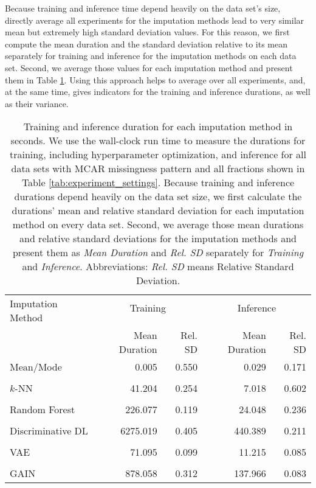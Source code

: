 Because training and inference time depend heavily on the data set's size, directly average all experiments for the imputation methods lead to very similar mean but extremely high standard deviation values. For this reason, we first compute the mean duration and the standard deviation relative to its mean separately for training and inference for the imputation methods on each data set. Second, we average those values for each imputation method and present them in Table \ref{tab:time}. Using this approach helps to average over all experiments, and, at the same time, gives indicators for the training and inference durations, as well as their variance.
%
\begin{table}
	\centering
	\begin{tabular}{@{\extracolsep{4pt}}lrrrr@{}}
		\toprule
		\multirow{2}{*}{Imputation Method} & \multicolumn{2}{c}{Training} & \multicolumn{2}{c}{Inference} \\\cline{2-3}\cline{4-5}
		\\[-0.75em]
		& Mean Duration &   Rel. SD & Mean Duration &   Rel. SD \\
		\midrule
		Mean/Mode &      0.005 &  0.550 &      0.029 &  0.171 \\
		\\[-0.5em]
		$k$-NN &     41.204 &  0.254 &       7.018 &  0.602 \\
		\\[-0.5em]
		Random Forest &    226.077 &  0.119 &     24.048 &  0.236 \\
		\\[-0.5em]
		Discriminative DL &   6275.019 &   0.405 &    440.389 &  0.211 \\
		\\[-0.5em]
		VAE &     71.095 &  0.099 &      11.215 &  0.085 \\
		\\[-0.5em]
		GAIN &    878.058 &  0.312 &     137.966 &  0.083 \\
		\bottomrule
	\end{tabular}
	\caption{Training and inference duration for each imputation method in seconds. We use the wall-clock run time to measure the durations for training, including hyperparameter optimization, and inference for all data sets with MCAR missingness pattern and all fractions shown in Table \ref{tab:experiment_settings}. Because training and inference durations depend heavily on the data set size, we first calculate the durations' mean and relative standard deviation for each imputation method on every data set. Second, we average those mean durations and relative standard deviations for the imputation methods and present them as \emph{Mean Duration} and \emph{Rel. SD} separately for \emph{Training} and \emph{Inference}. Abbreviations: \emph{Rel. SD} means Relative Standard Deviation.
	}
	\label{tab:time}
\end{table}

